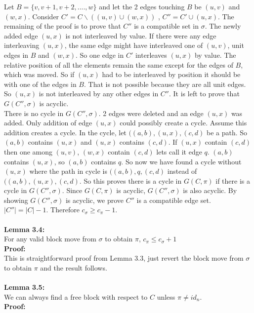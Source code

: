 \documentclass[BTech]{iitmdiss}
\begin{document}
Let $B = \{v,v+1,v+2,....,w\}$ and let the 2 edges touching $B$ be $(u,v)$ and $(w,x)$. Consider $C' = C\backslash ((u,v)\cup(w,x))$ , $C'' = C' \cup (u,x)$. The remaining of the proof is to prove that $C''$ is a compatible set in $\sigma$. The newly added edge $(u,x)$ is not interleaved by value. If there were any edge interleaving $(u,x)$, the same edge might have interleaved one of $(u,v)$, unit edges in $B$ and $(w,x)$. So one edge in $C'$ interleaves $(u,x)$ by value. The relative position of all the elements remain the same except for the edges of $B$, which was moved. So if $(u,x)$ had to be interleaved by position it should be with one of the edges in $B$. That is not possible because they are all unit edges. So $(u,x)$ is not interleaved by any other edges in $C''$. It is left to prove that $G(C'',\sigma)$ is acyclic.\\ There is no cycle in $G(C'',\sigma)$. 2 edges were deleted and an edge $(u,x)$ was added. Only addition of edge $(u,x)$ could possibly create a cycle. Assume this addition creates a cycle. In the cycle, let $((a,b),(u,x),(c,d)$ be a path. So $(a,b)$ contains $(u,x)$ and $(u,x)$ contains $(c,d)$. If $(u,x)$ contain $(c,d)$ then one among $(u,v)$, $(w,x)$ contain $(c,d)$ lets call it edge $q$. $(a,b)$ contains $(u,x)$, so $(a,b)$ contains $q$. So now we have found a cycle without $(u,x)$ where the path in cycle is $((a,b),q,(c,d)$ instead of $((a,b),(u,x),(c,d)$. So this proves there is a cycle in $G(C,\pi)$ if there is a cycle in $G(C'',\sigma)$. Since $G(C,\pi)$ is acyclic, $G(C'',\sigma)$ is also acyclic. By showing $G(C'',\sigma)$ is acyclic, we prove $C''$ is a compatible edge set. $|C''| = |C| - 1$. Therefore $c_\sigma \geq c_\pi - 1$.\\~\\
\noindent
\textbf{Lemma 3.4:}\\
For any valid block move from $\sigma$ to obtain $\pi$, $c_\pi \leq c_\sigma + 1$\\
\textbf{Proof:}\\
This is straightforward proof from Lemma 3.3, just revert the block move from $\sigma$ to obtain $\pi$ and the result follows.\\~\\
\noindent
\textbf{Lemma 3.5:}\\
We can always find a free block with respect to $C$ unless $\pi \neq id_n$.\\
\textbf{Proof:}\\
\end{document}
